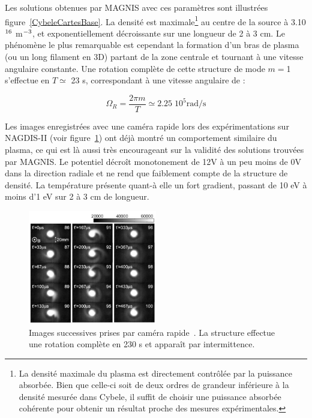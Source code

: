 \begin{refsection}
Les solutions obtenues par MAGNIS avec ces paramètres sont illustrées
figure~\ref{CybeleCartesBase}. La densité est maximale\footnote{La
densité maximale du plasma est directement contrôlée par la puissance
absorbée. Bien que celle-ci soit de deux ordres de grandeur inférieure à la
densité mesurée dans Cybele, il suffit de choisir une puissance absorbée
cohérente pour obtenir un résultat proche des mesures expérimentales.} au centre
de la source à 3.10$^{{16}}$ m$^{{-3}}$, et
exponentiellement décroissante sur une longueur de 2 à 3 cm. Le phénomène le plus
remarquable est cependant la formation d'un bras de plasma (ou un long filament
en 3D) partant de la zone centrale et tournant à une vitesse angulaire
constante.
Une rotation complète de cette structure de mode $m=$1 s'effectue en $T\simeq$
23 \micro s, correspondant à une vitesse angulaire de :

\begin{equation}
\Omega_R=\frac{2\pi m}{T}\simeq2.25\;10^5\text{rad/s}
\end{equation}

Les images enregistrées avec une caméra rapide lors des expérimentations
sur NAGDIS-II (voir figure~\ref{4-CybeleNagdis}) ont déjà montré un comportement
similaire du plasma, ce qui est là aussi très
encourageant sur la validité des solutions trouvées par MAGNIS. Le potentiel
décroît monotonement de 12V à un peu moins de 0V dans la direction radiale et
ne rend que faiblement compte de la structure de densité.
 La température présente quant-à elle un fort gradient, passant de 10 eV à moins
 d'1 eV sur 2 à 3 cm de longueur.

\begin{figure}[!htbp]
\centering
\includegraphics[width=0.5\textwidth]{figures/4-CybeleNAGDIS.png}
\caption{Images successives prises par caméra rapide~\parencite{NagdisCamera}.
La structure effectue une rotation complète en 230 \micro s et apparaît par
intermittence.
\label{4-CybeleNagdis}}
\end{figure}


\end{refsection}
